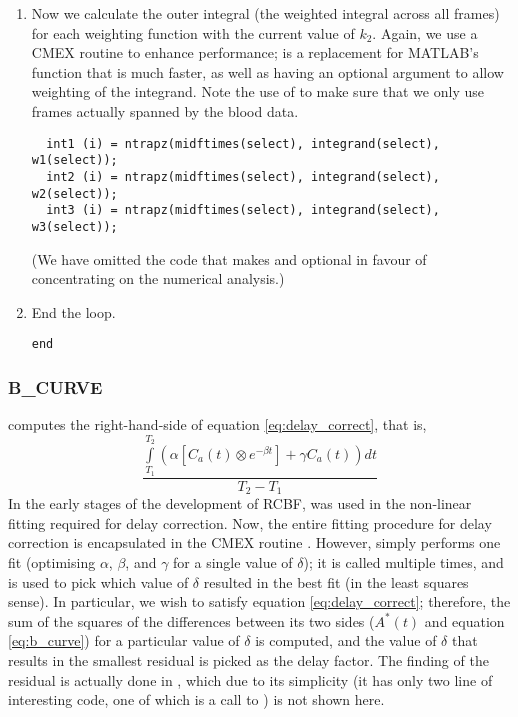 \begin{enumerate}
\item Now we calculate the outer integral (the weighted integral
  across all frames) for each weighting function with the current
  value of $k_2$.  Again, we use a CMEX routine to enhance
  performance;  is a replacement for MATLAB's
   function that is much faster, as well as having an
  optional argument to allow weighting of the integrand.  Note the use
  of  to make sure that we only use frames actually
  spanned by the blood data.
\begin{verbatim}
  int1 (i) = ntrapz(midftimes(select), integrand(select), w1(select));
  int2 (i) = ntrapz(midftimes(select), integrand(select), w2(select));
  int3 (i) = ntrapz(midftimes(select), integrand(select), w3(select));
\end{verbatim}
(We have omitted the code that makes  and 
optional in favour of concentrating on the numerical analysis.)

\item End the  loop.
\begin{verbatim}
end
\end{verbatim}

\end{enumerate}


\subsubsection{B\_CURVE}

 computes the right-hand-side of equation
\ref{eq:delay_correct}, that is,
\begin{equation}
\frac{\int\limits_{T_1}^{T_2} 
  \left( \alpha 
    \left[ C_a(t) \otimes  e^{-\beta t} \right] 
  + \gamma C_a(t) \right) dt} {T_2 - T_1}
\label{eq:b_curve}
\end{equation}
In the early stages of the development of RCBF,  was
used in the non-linear fitting required for delay correction.  Now,
the entire fitting procedure for delay correction is encapsulated in
the CMEX routine .  However, 
simply performs one fit (optimising $\alpha$, $\beta$, and $\gamma$
for a single value of $\delta$); it is called multiple times, and
 is used to pick which value of $\delta$ resulted in
the best fit (in the least squares sense).  In particular, we wish to
satisfy equation \ref{eq:delay_correct}; therefore, the sum of the
squares of the differences between its two sides ($A^{*} (t)$ and
equation \ref{eq:b_curve}) for a particular value of $\delta$ is
computed, and the value of $\delta$ that results in the smallest
residual is picked as the delay factor.  The finding of the residual
is actually done in , which due to its simplicity
(it has only two line of interesting code, one of which is a call to
) is not shown here.

